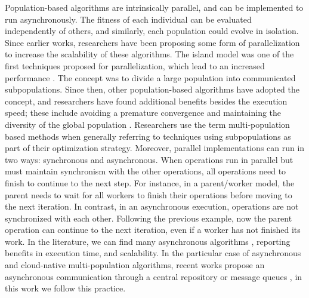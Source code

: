 \documentclass[review]{elsarticle}
\begin{document}
Population-based algorithms are intrinsically parallel, and can be implemented to run asynchronously.
The fitness of each individual can be evaluated independently of 
others, and similarly, each population could evolve in isolation. Since 
earlier works, researchers have been proposing some form of parallelization
\cite{muhlenbein1988evolution} to increase the scalability of these algorithms.
The island model was one of the first techniques proposed for parallelization,
which lead to an increased performance \cite{gorges1990explicit,grosso1985computer}. 
The concept was to divide a large population into communicated subpopulations. 
Since then, other population-based algorithms have adopted the concept, 
and researchers have found additional benefits
besides the execution speed; these include avoiding a premature convergence and
maintaining the diversity of the global population \cite{li2015multi}. Researchers use the term
multi-population based methods when generally referring to techniques using
subpopulations as part of their optimization strategy. %
Moreover, parallel implementations can run in two ways: synchronous and
asynchronous. When operations run in parallel but must maintain synchronism with
the other operations,  all operations need to finish to continue to the next
step. For instance, in a  parent/worker model, the parent needs to wait for all
workers to finish their operations before moving to the next iteration.  In
contrast, in an asynchronous execution,  operations are not synchronized with
each other. Following the previous example, now the parent operation can
continue to the next iteration, even if a worker has not finished its work.  In
the literature, we can find many asynchronous algorithms
\cite{coleman89,baugh2003asynchronous}, reporting benefits in execution time,
and scalability. In the particular case of asynchronous and cloud-native
multi-population algorithms, recent works propose an asynchronous communication
through a central repository \cite{sofea:cec2012, JSON} or message queues
\cite{salza2019speed, guervos2018introducing}, in this work we follow this
practice.
\end{document}
